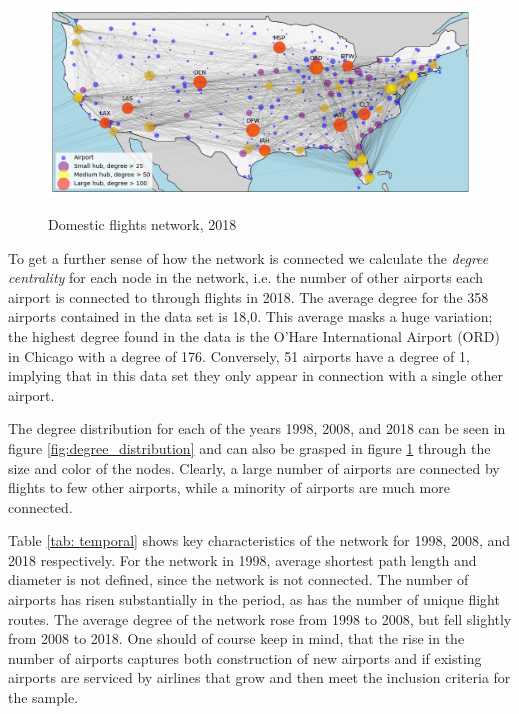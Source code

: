 \begin{figure}[H]
  \centering
  \caption{Domestic flights network, 2018}
    \includegraphics[width=1. \textwidth]{Exam/Figures/map_general_18}
    \vspace{-0.7cm}
  \label{fig:map_general_18}
\end{figure}
\noindent
To get a further sense of how the network is connected we calculate the \textit{degree centrality} for each node in the network, i.e. the number of other airports each airport is connected to through flights in 2018. The average degree for the 358 airports contained in the data set is 18,0. This average masks a huge variation; the highest degree found in the data is the O'Hare International Airport (ORD) in Chicago with a degree of 176.  Conversely, 51 airports have a degree of 1, implying that in this data set they only appear in connection with a single other airport.
\par
The degree distribution for each of the years 1998, 2008, and 2018 can be seen in figure \ref{fig:degree_distribution} and can also be grasped in figure \ref{fig:map_general_18} through the size and color of the nodes. Clearly, a large number of airports are connected by flights to few other airports, while a minority of airports are much more connected.
\par
Table \ref{tab: temporal} shows key characteristics of the network for 1998, 2008, and 2018 respectively. For the network in 1998, average shortest path length and diameter is not defined, since the network is not connected. The number of airports has risen substantially in the period, as has the number of unique flight routes. The average degree of the network rose from 1998 to 2008, but fell slightly from 2008 to 2018. One should of course keep in mind, that the rise in the number of airports captures both construction of new airports and if existing airports are serviced by airlines that grow and then meet the inclusion criteria for the sample.
